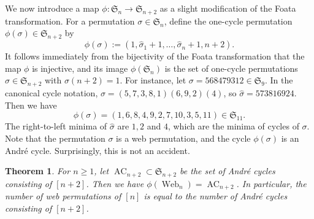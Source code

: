 \documentclass[reqno,12pt]{amsart}
\newtheorem{thm}{Theorem}[section]
\theoremstyle{definition}
\theoremstyle{remark}
\newcommand\AC{\operatorname{AC}}
\newcommand\Web{\operatorname{Web}}
\newcommand\SYM{\mathfrak{S}}
\begin{document}
We now introduce a map $\phi : \SYM_n \rightarrow \SYM_{n+2}$ as
a slight modification of the Foata transformation.
For a permutation $\sigma \in \SYM_n$,
define the one-cycle permutation $\phi(\sigma) \in\SYM_{n+2}$ by
\[
  \phi(\sigma):=(1,\widehat{\sigma}_1 +1, \dots, \widehat{\sigma}_n+1, n+2).
\]
It follows immediately from the bijectivity of the Foata transformation
that the map \( \phi \) is injective, and its image \( \phi(\SYM_n) \) is the
set of one-cycle permutations \( \sigma\in\SYM_{n+2} \) with \( \sigma(n+2)=1 \).
For instance, let \( \sigma=568479312\in\SYM_9 \). In the canonical cycle notation,
\( \sigma=(5,7,3,8,1)(6,9,2)(4) \), so \( \widehat{\sigma}=573816924 \).
Then we have \[ \phi(\sigma) = (1,6,8,4,9,2,7,10,3,5,11)\in\SYM_{11}. \]
The right-to-left minima of \( \widehat{\sigma} \) are \( 1,2 \) and \( 4 \),
which are the minima of cycles of \( \sigma \).
Note that the permutation \( \sigma \) is a web permutation,
and the cycle \( \phi(\sigma) \) is an Andr\'e cycle.
Surprisingly, this is not an accident.
\begin{thm}\label{thm:webn=Andren+2}
  For \( n\ge 1 \), let \( \AC_{n+2}\subset\SYM_{n+2} \) be the set of
  Andr\'e cycles consisting of \( [n+2] \).
  Then we have \( \phi(\Web_n) = \AC_{n+2} \).
  In particular, the number of web permutations of \( [n] \) is equal to
  the number of Andr\'e cycles consisting of \( [n+2] \).
\end{thm}
\end{document}
